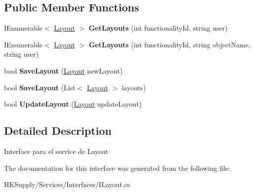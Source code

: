 \subsection*{Public Member Functions}
\begin{DoxyCompactItemize}
\item 
\mbox{\label{interface_h_k_supply_1_1_services_1_1_interfaces_1_1_i_layout_a08cfe2347106876e4c16d2d9f245d939}} 
I\+Enumerable$<$ \mbox{\hyperlink{class_h_k_supply_1_1_models_1_1_layout}{Layout}} $>$ {\bfseries Get\+Layouts} (int functionality\+Id, string user)
\item 
\mbox{\label{interface_h_k_supply_1_1_services_1_1_interfaces_1_1_i_layout_ae81035ab858e4d7d1b471c9fffbf7ed7}} 
I\+Enumerable$<$ \mbox{\hyperlink{class_h_k_supply_1_1_models_1_1_layout}{Layout}} $>$ {\bfseries Get\+Layouts} (int functionality\+Id, string object\+Name, string user)
\item 
\mbox{\label{interface_h_k_supply_1_1_services_1_1_interfaces_1_1_i_layout_ad083e059f5734c1cd4df7355701d6f7a}} 
bool {\bfseries Save\+Layout} (\mbox{\hyperlink{class_h_k_supply_1_1_models_1_1_layout}{Layout}} new\+Layout)
\item 
\mbox{\label{interface_h_k_supply_1_1_services_1_1_interfaces_1_1_i_layout_afa7ecd559d260cfdd2aefdd68191b1f0}} 
bool {\bfseries Save\+Layout} (List$<$ \mbox{\hyperlink{class_h_k_supply_1_1_models_1_1_layout}{Layout}} $>$ layouts)
\item 
\mbox{\label{interface_h_k_supply_1_1_services_1_1_interfaces_1_1_i_layout_a15677db354cc020d6acdf7818f803474}} 
bool {\bfseries Update\+Layout} (\mbox{\hyperlink{class_h_k_supply_1_1_models_1_1_layout}{Layout}} update\+Layout)
\end{DoxyCompactItemize}


\subsection{Detailed Description}
Interface para el service de Layout 



The documentation for this interface was generated from the following file\+:\begin{DoxyCompactItemize}
\item 
H\+K\+Supply/\+Services/\+Interfaces/I\+Layout.\+cs\end{DoxyCompactItemize}
